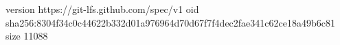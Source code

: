 version https://git-lfs.github.com/spec/v1
oid sha256:8304f34c0c44622b332d01a976964d70d67f7f4dec2fae341c62ce18a49b6c81
size 11088
